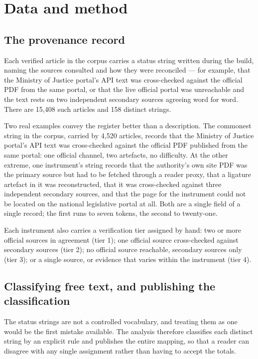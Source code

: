\documentclass[11pt]{article}
\begin{document}
\section{Data and method}
\label{sec:method}

\subsection{The provenance record}

Each verified article in the corpus carries a status string written during the
build, naming the sources consulted and how they were reconciled --- for
example, that the Ministry of Justice portal's API text was cross-checked
against the official PDF from the same portal, or that the live official portal
was unreachable and the text rests on two independent secondary sources agreeing
word for word. There are 15,408 such articles and 158 distinct strings.

Two real examples convey the register better than a description. The
commonest string in the corpus, carried by 4,520 articles, records that the
Ministry of Justice portal's API text was cross-checked against the official
PDF published from the same portal: one official channel, two artefacts, no
difficulty. At the other extreme, one instrument's string records that the
authority's own site PDF was the primary source but had to be fetched through
a reader proxy, that a ligature artefact in it was reconstructed, that it was
cross-checked against three independent secondary sources, and that the page
for the instrument could not be located on the national legislative portal at
all. Both are a single field of a single record; the first runs to seven
tokens, the second to twenty-one.

Each instrument also carries a verification tier assigned by hand: two or more
official sources in agreement (tier 1); one official source cross-checked
against secondary sources (tier 2); no official source reachable, secondary
sources only (tier 3); or a single source, or evidence that varies within the
instrument (tier 4).

\subsection{Classifying free text, and publishing the classification}

The status strings are not a controlled vocabulary, and treating them as one
would be the first mistake available. The analysis therefore classifies each
distinct string by an explicit rule and publishes the entire mapping, so that a
reader can disagree with any single assignment rather than having to accept the
totals.
\end{document}
